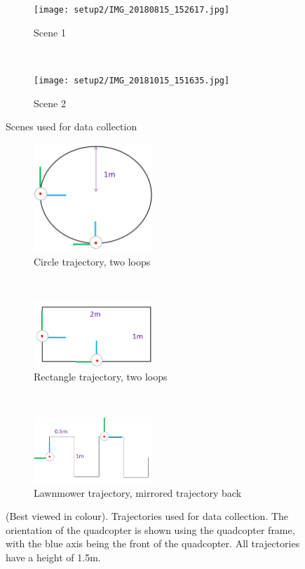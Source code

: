 \documentclass[12pt,a4paper]{article}
\begin{document}
    \begin{figure}[b!]
      \centering
      \begin{subfigure}[t]{0.45\textwidth}
      \centering
        \texttt{[image: setup2/IMG\_20180815\_152617.jpg]}
      \caption{Scene 1}
      \end{subfigure} %
      ~
      \begin{subfigure}[t]{0.45\textwidth}
      \centering
        \texttt{[image: setup2/IMG\_20181015\_151635.jpg]}
      \caption{Scene 2}
      \end{subfigure}
      \caption{Scenes used for data collection}
      \label{f: scenes}
    \end{figure}

    \begin{figure}[t!]
      \centering
      \begin{subfigure}[t]{0.3\textwidth}
      \centering
        \includegraphics[width=45mm]{trjs/circle.PNG}
      \caption{Circle trajectory, two loops}
      \end{subfigure} %
      ~
      \begin{subfigure}[t]{0.3\textwidth}
      \centering
        \includegraphics[width=45mm]{trjs/rectangle.PNG}
      \caption{Rectangle trajectory, two loops}
      \end{subfigure}%
      ~
      \begin{subfigure}[t]{0.3\textwidth}
      \centering
        \includegraphics[width=45mm]{trjs/lawnmower.PNG}
      \caption{Lawnmower trajectory, mirrored trajectory back}
      \end{subfigure}
      \caption{(Best viewed in colour). Trajectories used for data collection. The orientation of the quadcopter is shown using the quadcopter frame, with the blue axis being the front of the quadcopter. All trajectories have a height of 1.5m.}
      \label{f: 3 trjs}
    \end{figure}
\end{document}
